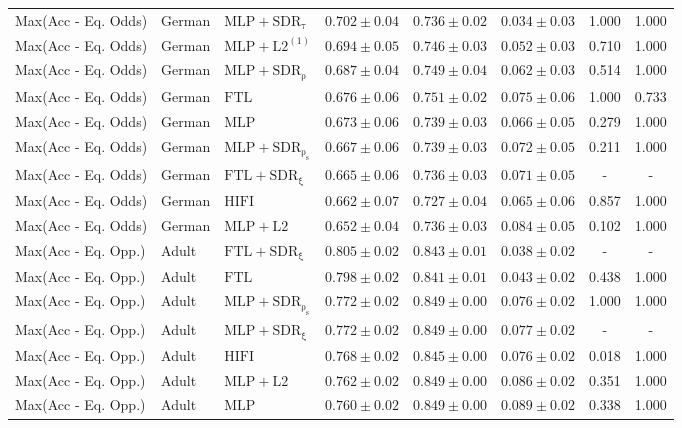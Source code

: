 \begin{table}[htbp]
\begin{tabular}{lllccccc}
Max(Acc - Eq. Odds) & German & $\mathrm{MLP+SDR_{\tau}}$ & $0.702 \pm0.04$ & $0.736 \pm0.02$ & $0.034 \pm0.03$ & 1.000 & 1.000 \\
Max(Acc - Eq. Odds) & German & $\mathrm{MLP+L2^{(1)}}$ & $0.694 \pm0.05$ & $0.746 \pm0.03$ & $0.052 \pm0.03$ & 0.710 & 1.000 \\
Max(Acc - Eq. Odds) & German & $\mathrm{MLP+SDR_{\rho}}$ & $0.687 \pm0.04$ & $0.749 \pm0.04$ & $0.062 \pm0.03$ & 0.514 & 1.000 \\
Max(Acc - Eq. Odds) & German & $\mathrm{FTL}$ & $0.676 \pm0.06$ & $0.751 \pm0.02$ & $0.075 \pm0.06$ & 1.000 & 0.733 \\
Max(Acc - Eq. Odds) & German & $\mathrm{MLP}$ & $0.673 \pm0.06$ & $0.739 \pm0.03$ & $0.066 \pm0.05$ & 0.279 & 1.000 \\
Max(Acc - Eq. Odds) & German & $\mathrm{MLP+SDR_{\rho_s}}$ & $0.667 \pm0.06$ & $0.739 \pm0.03$ & $0.072 \pm0.05$ & 0.211 & 1.000 \\
Max(Acc - Eq. Odds) & German & $\mathrm{FTL+SDR_{\xi}}$ & $0.665 \pm0.06$ & $0.736 \pm0.03$ & $0.071 \pm0.05$ & - & - \\
Max(Acc - Eq. Odds) & German & $\mathrm{HIFI}$ & $0.662 \pm0.07$ & $0.727 \pm0.04$ & $0.065 \pm0.06$ & 0.857 & 1.000 \\
Max(Acc - Eq. Odds) & German & $\mathrm{MLP+L2}$ & $0.652 \pm0.04$ & $0.736 \pm0.03$ & $0.084 \pm0.05$ & 0.102 & 1.000 \\
\midrule
Max(Acc - Eq. Opp.) & Adult & $\mathrm{FTL+SDR_{\xi}}$ & $0.805 \pm0.02$ & $0.843 \pm0.01$ & $0.038 \pm0.02$ & - & - \\
Max(Acc - Eq. Opp.) & Adult & $\mathrm{FTL}$ & $0.798 \pm0.02$ & $0.841 \pm0.01$ & $0.043 \pm0.02$ & 0.438 & 1.000 \\
Max(Acc - Eq. Opp.) & Adult & $\mathrm{MLP+SDR_{\rho_s}}$ & $0.772 \pm0.02$ & $0.849 \pm0.00$ & $0.076 \pm0.02$ & 1.000 & 1.000 \\
Max(Acc - Eq. Opp.) & Adult & $\mathrm{MLP+SDR_{\xi}}$ & $0.772 \pm0.02$ & $0.849 \pm0.00$ & $0.077 \pm0.02$ & - & - \\
Max(Acc - Eq. Opp.) & Adult & $\mathrm{HIFI}$ & $0.768 \pm0.02$ & $0.845 \pm0.00$ & $0.076 \pm0.02$ & 0.018 & 1.000 \\
Max(Acc - Eq. Opp.) & Adult & $\mathrm{MLP+L2}$ & $0.762 \pm0.02$ & $0.849 \pm0.00$ & $0.086 \pm0.02$ & 0.351 & 1.000 \\
Max(Acc - Eq. Opp.) & Adult & $\mathrm{MLP}$ & $0.760 \pm0.02$ & $0.849 \pm0.00$ & $0.089 \pm0.02$ & 0.338 & 1.000 \\

\end{tabular}
\end{table}
